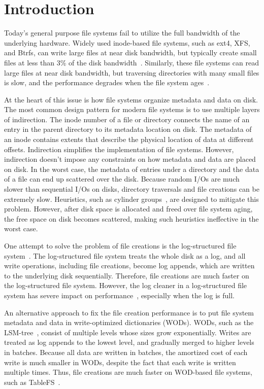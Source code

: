 \chapter{Introduction}
\label{chap:intro}

Today's general purpose file systems fail to utilize the full bandwidth of the
underlying hardware.
Widely used inode-based file systems, such as ext4, XFS, and Btrfs, can write
large files at near disk bandwidth,
but typically create small files at less than 3\% of the disk bandwidth~\citep{betrfs2}.
Similarly, these file systems can read large files at near disk bandwidth,
but traversing directories with many small files is slow, and the performance
degrades when the file system ages~\citep{betrfs3}.

At the heart of this issue is how file systems organize metadata and data
on disk.
The most common design pattern for modern file systems is to use multiple layers
of indirection.
The inode number of a file or directory connects the name of an entry in the
parent directory to its metadata location on disk.
The metadata of an inode contains extents that describe the physical location
of data at different offsets.
Indirection simplifies the implementation of file systems.
However, indirection doesn't impose any constraints on how metadata and
data are placed on disk.
In the worst case, the metadata of entries under a directory and the data of
a file can end up scattered over the disk.
Because random I/Os are much slower than sequential I/Os on disks,
directory traversals and file creations can be extremely slow.
Heuristics, such as cylinder groups~\citep{ffs1}, are designed to mitigate this
problem.
However, after disk space is allocated and freed over file system aging,
the free space on disk becomes scattered, making such heuristics
ineffective in the worst case.

One attempt to solve the problem of file creations is the log-structured file
system~\citep{lfs}.
The log-structured file system treats the whole disk as a log,
and all write operations, including file creations, become log appends,
which are written to the underlying disk sequentially.
Therefore, file creations are much faster on the log-structured file system.
However, the log cleaner in a log-structured file system has severe impact on
performance~\citep{lfsbsd}, especially when the log is full.

An alternative approach to fix the file creation performance is to put
file system metadata and data in write-optimized dictionaries (WODs).
WODs, such as the LSM-tree~\cite{lsm},
consist of multiple levels whose sizes grow exponentially.
Writes are treated as log appends to the lowest level, and gradually merged to
higher levels in batches.
Because all data are written in batches, the amortized cost of each write is
much smaller in WODs,
despite the fact that each write is written multiple times.
Thus, file creations are much faster on WOD-based file systems, such as
TableFS~\citep{tablefs}.

